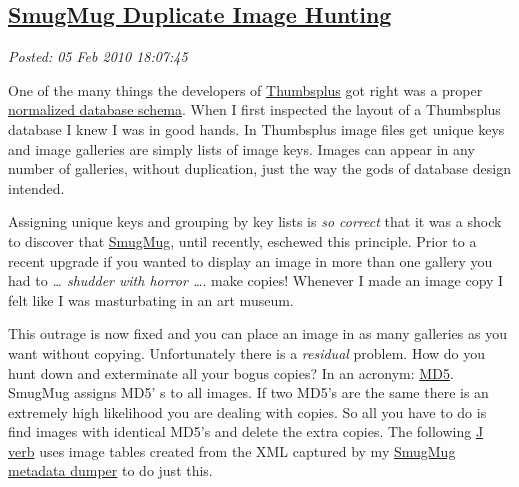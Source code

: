 %

\subsection*{\href{https://bakerjd99.wordpress.com/2010/02/05/smugmug-duplicate-image-hunting/}{SmugMug Duplicate Image Hunting}}


\noindent\emph{Posted: 05 Feb 2010 18:07:45}
\vspace{6pt}

One of the many things the developers of
\href{http://www.cerious.com/}{Thumbsplus} got right was a proper
\href{http://en.wikipedia.org/wiki/Database\_normalization}{normalized
database schema}. When I first inspected the layout of a Thumbsplus
database I knew I was in good hands. In Thumbsplus image files get
unique keys and image galleries are simply lists of image keys. Images
can appear in any number of galleries, without duplication, just the way
the gods of database design intended.

Assigning unique keys and grouping by key lists is \emph{so correct}
that it was a shock to discover that
\href{http://www.smugmug.com/}{SmugMug}, until recently, eschewed this
principle. Prior to a recent upgrade if you wanted to display an image
in more than one gallery you had to \emph{\ldots{} shudder with horror
\ldots{}}. make copies! Whenever I made an image copy I felt like I was
masturbating in an art museum.

This outrage is now fixed and you can place an image in as many
galleries as you want without copying. Unfortunately there is a
\emph{residual} problem. How do you hunt down and exterminate all your
bogus copies? In an acronym:
\href{http://www.fastsum.com/support/md5-checksum-utility-faq/md5-hash.php}{MD5}.
SmugMug assigns MD5' s to all images. If two MD5's are the same there is
an extremely high likelihood you are dealing with copies. So all you
have to do is find images with identical MD5's and delete the extra
copies. The following \href{http://www.jsoftware.com/}{J verb} uses image
tables created from the XML captured by my
\href{http://bakerjd99.wordpress.com/2010/02/03/command-line-c-smugmug-api-metadata-download/}{SmugMug
metadata dumper} to do just this.

